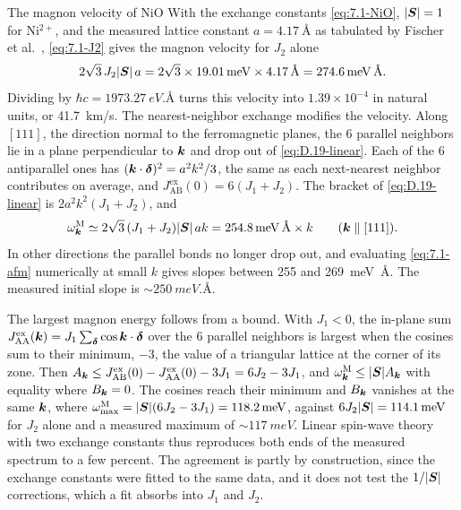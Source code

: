 \begin{workedexample}{The magnon velocity of NiO}\label{we:7-nio}
With the exchange constants \cref{eq:7.1-NiO}, $|\bm{S}| = 1$ for Ni$^{2+}$, and the measured lattice constant $a = \SI{4.17}{\angstrom}$ as tabulated by Fischer et al.~\cite[Table~I]{fischer2009exchange}, \cref{eq:7.1-J2} gives the magnon velocity for $J_2$ alone
\begin{equation*}
  2\sqrt3\,J_2|\bm{S}|\,a = 2\sqrt3\times\SI{19.01}{meV}\times\SI{4.17}{\angstrom} = \SI{274.6}{meV.\angstrom} .
\end{equation*}
Dividing by $\hbar c = \SI{1973.27}{eV.\angstrom}$ turns this velocity into $1.39\times10^{-4}$ in natural units, or \SI{41.7}{km/s}. The nearest-neighbor exchange modifies the velocity. Along $[111]$, the direction normal to the ferromagnetic planes, the 6 parallel neighbors lie in a plane perpendicular to $\bm{k}$ and drop out of \cref{eq:D.19-linear}. Each of the 6 antiparallel ones has $(\bm{k}\cdot\bm{\delta})^2 = a^2k^2/3$, the same as each next-nearest neighbor contributes on average, and $J^{\mathrm{ex}}_{\mathrm{AB}}(0) = 6(J_1 + J_2)$. The bracket of \cref{eq:D.19-linear} is $2a^2k^2(J_1 + J_2)$, and
\begin{equation*}
  \omega^{\mathrm{M}}_{\bm{k}} \simeq 2\sqrt3\,(J_1 + J_2)|\bm{S}|\,ak = \SI{254.8}{meV.\angstrom}\times k \qquad (\bm{k} \parallel [111]) .
\end{equation*}
In other directions the parallel bonds no longer drop out, and evaluating \cref{eq:7.1-afm} numerically at small $k$ gives slopes between 255 and \SI{269}{meV.\angstrom}. The measured initial slope is ${\sim}\SI{250}{meV.\angstrom}$.

The largest magnon energy follows from a bound. With $J_1 < 0$, the in-plane sum $J^{\mathrm{ex}}_{\mathrm{AA}}(\bm{k}) = J_1\sum_{\bm{\delta}}\cos\bm{k}\cdot\bm{\delta}$ over the 6 parallel neighbors is largest when the cosines sum to their minimum, $-3$, the value of a triangular lattice at the corner of its zone. Then $A_{\bm{k}} \le J^{\mathrm{ex}}_{\mathrm{AB}}(0) - J^{\mathrm{ex}}_{\mathrm{AA}}(0) - 3J_1 = 6J_2 - 3J_1$, and $\omega^{\mathrm{M}}_{\bm{k}} \le |\bm{S}|A_{\bm{k}}$ with equality where $B_{\bm{k}} = 0$. The cosines reach their minimum and $B_{\bm{k}}$ vanishes at the same $\bm{k}$, where $\omega^{\mathrm{M}}_{\mathrm{max}} = |\bm{S}|(6J_2 - 3J_1) = \SI{118.2}{meV}$, against $6J_2|\bm{S}| = \SI{114.1}{meV}$ for $J_2$ alone and a measured maximum of ${\sim}\SI{117}{meV}$. Linear spin-wave theory with two exchange constants thus reproduces both ends of the measured spectrum to a few percent. The agreement is partly by construction, since the exchange constants were fitted to the same data, and it does not test the $1/|\bm{S}|$ corrections, which a fit absorbs into $J_1$ and $J_2$.


\end{workedexample}
